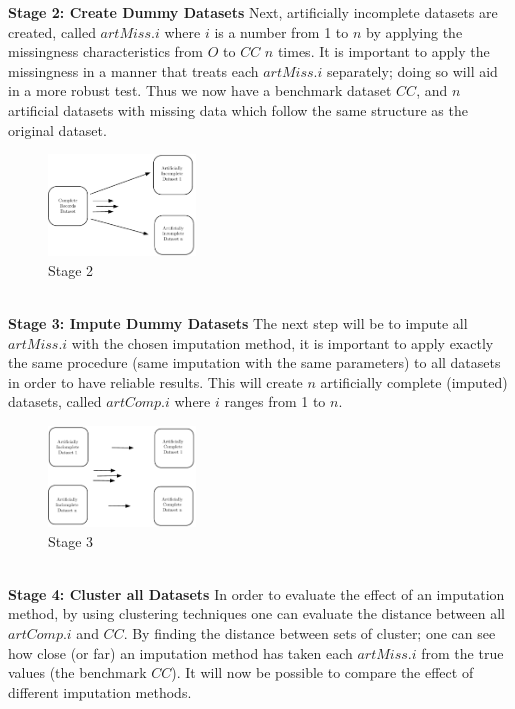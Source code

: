 \documentclass[conference,compsoc]{IEEEtran}
\begin{document}
		\indent \textbf{Stage 2: Create Dummy Datasets}
		Next, artificially incomplete datasets are created, called $artMiss.i$ where $i$ is a number from 1 to $n$ by applying the missingness characteristics from $O$ to $CC$ $n$ times. It is important to apply the missingness in a manner that treats each $artMiss.i$ separately; doing so will aid in a more robust test. Thus we now have a benchmark dataset $CC$, and $n$ artificial datasets with missing data which follow the same structure as the original dataset.
		\begin{figure}[!ht]
			\caption{Stage 2}
			\centering
			\includegraphics[width=0.35\textwidth]{stage22.pdf}
		\end{figure}
		\\
		\indent \textbf{Stage 3: Impute Dummy Datasets}
		The next step will be to impute all $artMiss.i$ with the chosen imputation method, it is important to apply exactly the same procedure (same imputation with the same parameters) to all datasets in order to have reliable results. This will create $n$ artificially complete (imputed) datasets, called $artComp.i$ where $i$ ranges from 1 to $n$. 
		\begin{figure}[!ht]
			\caption{Stage 3}
			\centering
			\includegraphics[width=0.35\textwidth]{stage3-2.pdf}
		\end{figure}
		\\
		\indent \textbf{Stage 4: Cluster all Datasets}
		In order to evaluate the effect of an imputation method, by using clustering techniques one can evaluate the distance between all $artComp.i$ and $CC$. By finding the distance between sets of cluster; one can see how close (or far) an imputation method has taken each $artMiss.i$ from the true values (the benchmark $CC$).
		It will now be possible to compare the effect of different imputation methods.
\end{document}
